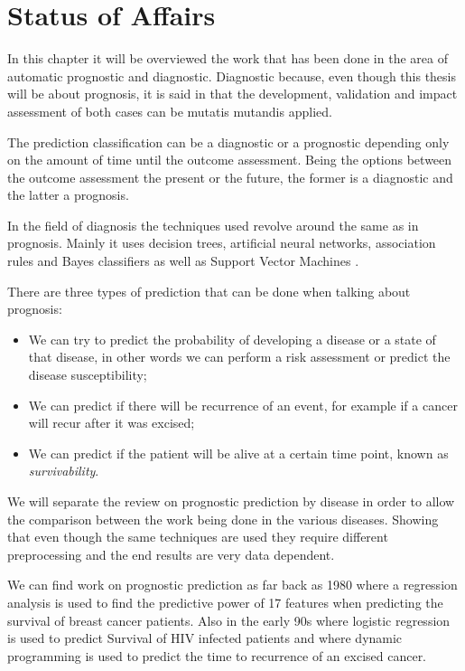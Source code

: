 \chapter{Status of Affairs}
\label{chapter:rw}

In this chapter it will be overviewed the work that has been done in the area of automatic prognostic and diagnostic. Diagnostic because,
 even though this thesis will be about prognosis, it is said in \cite{Hendriksen2013} that the development, 
 validation and impact assessment of both cases can be mutatis mutandis applied. 

The prediction classification can be a diagnostic or a prognostic depending only on the amount of time until the outcome assessment. 
Being the options between the outcome assessment the present or the future, the former is a diagnostic and the latter a prognosis.

In the field of diagnosis the techniques used revolve around the same as in prognosis. Mainly it uses decision trees, artificial 
neural networks, association rules and Bayes classifiers as well as Support Vector Machines \cite{Kharya2012}.

There are three types of prediction that can be done when talking about prognosis:
\begin{itemize}
\item We can try to predict the probability of developing a disease or a state of that disease, in other words we can perform
 a risk assessment or predict the disease susceptibility;
\item We can predict if there will be recurrence of an event, for example if a cancer will recur after it was excised;
\item We can predict if the patient will be alive at a certain time point, known as \emph{survivability}. 

\end{itemize}

We will separate the review on prognostic prediction by disease in order to allow the comparison between the work being done in the various 
diseases. Showing that even though the same techniques are used they require different preprocessing and the end results are very data dependent.

We can find work on prognostic prediction as far back as 1980 \cite{Nash1980} where a regression analysis is used 
to find the predictive power of 17 features when predicting the survival of breast cancer patients. Also in the early
 90s \cite{Hanson1993} where logistic regression is used to predict Survival of HIV infected patients and
 \cite{Mangasarian1995} where dynamic programming is used to predict the time to recurrence of an excised cancer.
 
